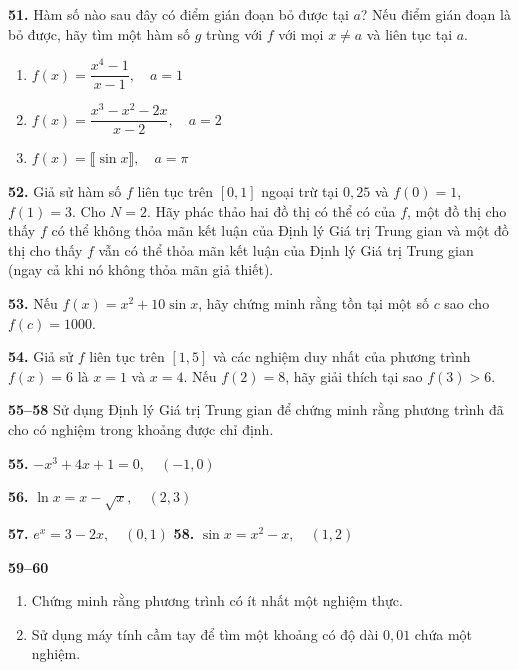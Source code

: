 \noindent
\begin{minipage}[t]{0.485\textwidth}
\textbf{51.} Hàm số nào sau đây có điểm gián đoạn bỏ được tại $a$? Nếu điểm gián đoạn là bỏ được, hãy tìm một hàm số $g$ trùng với $f$ với mọi $x \neq a$ và liên tục tại $a$.
\begin{enumerate}[label=\textnormal{(\alph*)}, itemsep=1.5pt, topsep=2.5pt, leftmargin=1.8em]
    \item $f(x) = \dfrac{x^4 - 1}{x - 1}, \quad a = 1$
    \item $f(x) = \dfrac{x^3 - x^2 - 2x}{x - 2}, \quad a = 2$
    \item $f(x) = \llbracket \sin x \rrbracket, \quad a = \pi$
\end{enumerate}

\vspace{0.65em}
\textbf{52.} Giả sử hàm số $f$ liên tục trên $[0, 1]$ ngoại trừ tại $0{,}25$ và $f(0) = 1$, $f(1) = 3$. Cho $N = 2$. Hãy phác thảo hai đồ thị có thể có của $f$, một đồ thị cho thấy $f$ có thể không thỏa mãn kết luận của Định lý Giá trị Trung gian và một đồ thị cho thấy $f$ vẫn có thể thỏa mãn kết luận của Định lý Giá trị Trung gian (ngay cả khi nó không thỏa mãn giả thiết).

\vspace{0.65em}
\textbf{53.} Nếu $f(x) = x^2 + 10 \sin x$, hãy chứng minh rằng tồn tại một số $c$ sao cho $f(c) = 1000$.

\vspace{0.65em}
\textbf{54.} Giả sử $f$ liên tục trên $[1, 5]$ và các nghiệm duy nhất của phương trình $f(x) = 6$ là $x = 1$ và $x = 4$. Nếu $f(2) = 8$, hãy giải thích tại sao $f(3) > 6$.

\vspace{0.75em}
\textbf{\color{stewartcyan}55--58}\; Sử dụng Định lý Giá trị Trung gian để chứng minh rằng phương trình đã cho có nghiệm trong khoảng được chỉ định.

\vspace{0.35em}
\textbf{55.} $-x^3 + 4x + 1 = 0, \quad (-1, 0)$

\vspace{0.3em}
\textbf{56.} $\ln x = x - \sqrt{x}, \quad (2, 3)$

\vspace{0.3em}
\textbf{57.} $e^x = 3 - 2x, \quad (0, 1)$ \hfill \textbf{58.} $\sin x = x^2 - x, \quad (1, 2)$

\vspace{0.75em}
\noindent\textbf{\color{stewartcyan}59--60}\hspace{0.5em}%
\begin{minipage}[t]{0.78\linewidth}
\begin{enumerate}[label=\textnormal{(\alph*)}, itemsep=1.5pt, topsep=0pt, leftmargin=*, parsep=0pt]
    \item Chứng minh rằng phương trình có ít nhất một nghiệm thực.
    \item Sử dụng máy tính cầm tay để tìm một khoảng có độ dài $0{,}01$ chứa một nghiệm.
\end{enumerate}
\end{minipage}


\end{minipage}
